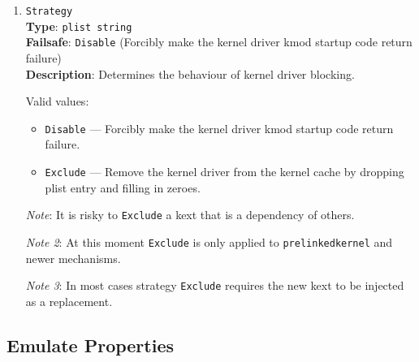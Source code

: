 \documentclass[]{article}
\providecommand{\tightlist}{%
  \setlength{\itemsep}{0pt}\setlength{\parskip}{0pt}}
\begin{document}
\begin{enumerate}
  \emph{Note}: Refer to the \hyperlink{kernmatch}{\texttt{Add\ MaxKernel} description} for matching logic.

\item
  \texttt{Strategy}\\
  \textbf{Type}: \texttt{plist\ string}\\
  \textbf{Failsafe}: \texttt{Disable} (Forcibly make the kernel driver kmod startup code return failure)\\
  \textbf{Description}: Determines the behaviour of kernel driver blocking.

  Valid values:

  \begin{itemize}
    \tightlist
    \item \texttt{Disable} --- Forcibly make the kernel driver kmod startup code return failure.
    \item \texttt{Exclude} --- Remove the kernel driver from the kernel cache by dropping plist entry and filling in zeroes.
  \end{itemize}

  \emph{Note}: It is risky to \texttt{Exclude} a kext that is a dependency of others.

  \emph{Note 2}: At this moment \texttt{Exclude} is only applied to \texttt{prelinkedkernel} and newer mechanisms.

  \emph{Note 3}: In most cases strategy \texttt{Exclude} requires the new kext to be injected as a replacement.

\end{enumerate}

\subsection{Emulate Properties}\label{kernelpropsemu}
\end{document}
